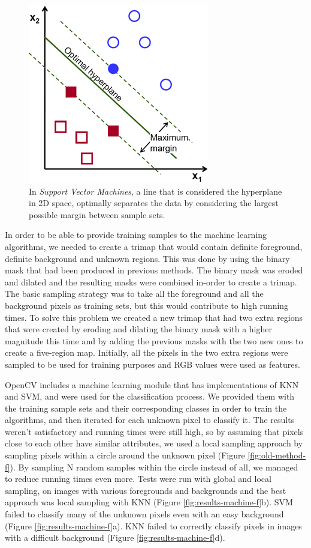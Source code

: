 \begin{figure}[t]
\centering
\includegraphics[width=0.5\columnwidth]{Chapter4/4/svm.png}
\caption[SVM 2-D sample space visualization.]{In \textit{Support Vector Machines}, a line that is considered the hyperplane in 2D space, optimally separates the data by considering the largest possible margin between sample sets.}
\label{fig:svm-space-f}
\end{figure}

In order to be able to provide training samples to the machine learning algorithms, we needed to create a trimap that would contain definite foreground, definite background and unknown regions. This was done by using the binary mask that had been produced in previous methods. The binary mask was eroded and dilated and the resulting masks were combined in-order to create a trimap. The basic sampling strategy was to take all the foreground and all the background pixels as training sets, but this would contribute to high running times. To solve this problem we created a new trimap that had two extra regions that were created by eroding and dilating the binary mask with a higher magnitude this time and by adding the previous masks with the two new ones to create a five-region map. Initially, all the pixels in the two extra regions were sampled to be used for training purposes and RGB values were used as features. 
\par
OpenCV includes a machine learning module that has implementations of KNN and SVM, and were used for the classification process. We provided them with the training sample sets and their corresponding classes in order to train the algorithms, and then iterated for each unknown pixel to classify it. The results weren't satisfactory and running times were still high, so by assuming that pixels close to each other have similar attributes, we used a local sampling approach by sampling pixels within a circle around the unknown pixel (Figure \ref{fig:old-method-f}). By sampling N random samples within the circle instead of all, we managed to reduce running times even more.
Tests were run with global and local sampling, on images with various foregrounds and backgrounds and the best approach was local sampling with KNN (Figure \ref{fig:results-machine-f}b). SVM failed to classify many of the unknown pixels even with an easy background (Figure \ref{fig:results-machine-f}a). KNN failed to correctly classify pixels in images with a difficult background (Figure \ref{fig:results-machine-f}d).

